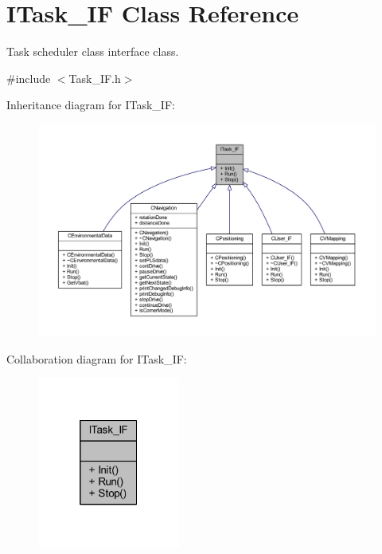 \hypertarget{class_i_task___i_f}{}\section{I\+Task\+\_\+\+IF Class Reference}
\label{class_i_task___i_f}


Task scheduler class interface class.  




{\ttfamily \#include $<$Task\+\_\+\+I\+F.\+h$>$}



Inheritance diagram for I\+Task\+\_\+\+IF\+:
\nopagebreak
\begin{figure}[H]
\begin{center}
\leavevmode
\includegraphics[width=350pt]{class_i_task___i_f__inherit__graph}
\end{center}
\end{figure}


Collaboration diagram for I\+Task\+\_\+\+IF\+:
\nopagebreak
\begin{figure}[H]
\begin{center}
\leavevmode
\includegraphics[width=133pt]{class_i_task___i_f__coll__graph}
\end{center}
\end{figure}
